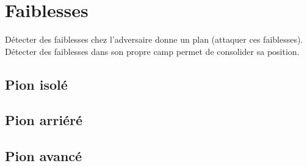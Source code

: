 
\section{Faiblesses}

Détecter des faiblesses chez l'adversaire donne un plan (attaquer ces faiblesses). Détecter des faiblesses dans son propre camp permet de consolider sa position.


\subsection{Pion isolé}


\subsection{Pion arriéré}


\subsection{Pion avancé}

